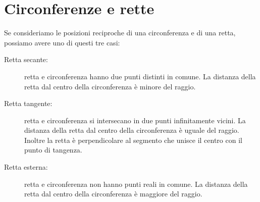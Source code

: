 \section{Circonferenze e rette}
\label{sec:circ_circrette}

Se consideriamo le posizioni reciproche di una circonferenza e di una retta, 
possiamo avere uno di questi tre casi:

\begin{description} %
 \item [Retta secante:] 
retta e circonferenza hanno due punti distinti in comune. La distanza della 
retta dal centro della circonferenza è minore del raggio.
 \item [Retta tangente:]
retta e circonferenza si intersecano in due punti infinitamente vicini. 
La distanza della retta dal centro della circonferenza è uguale del raggio. Inoltre la retta è
perpendicolare al segmento che unisce il centro con il punto di tangenza.
 \item [Retta esterna:]
retta e circonferenza non hanno punti reali in comune. 
La distanza della retta dal centro della circonferenza è maggiore del 
raggio.
\end{description}

\begin{comment}
\noindent\begin{minipage}{.48\textwidth}
TODO
\end{minipage}
\hfill
\begin{minipage}{.48\textwidth}
\begin{center}
\begin{inaccessibleblock}[Circonferenza con una retta secante, una retta 
tangente e una retta esterna.]
\end{inaccessibleblock}
\end{center}
\end{minipage}
\end{comment}

